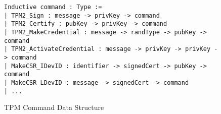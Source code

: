 \documentclass[runningheads]{llncs}
\begin{document}
\begin{figure}[hbtp]
\vspace{-\medskipamount}
\vspace{-\medskipamount}
  \begin{footnotesize}
\begin{lstlisting}[language=Coq]
Inductive command : Type :=
| TPM2_Sign : message -> privKey -> command
| TPM2_Certify : pubKey -> privKey -> command
| TPM2_MakeCredential : message -> randType -> pubKey -> command
| TPM2_ActivateCredential : message -> privKey -> privKey -> command
| MakeCSR_IDevID : identifier -> signedCert -> pubKey -> command
| MakeCSR_LDevID : message -> signedCert -> command
| ...
\end{lstlisting}
\end{footnotesize}
\vspace{-\medskipamount}
\caption{TPM Command Data Structure}
\label{fig:command-model}
\end{figure}



\end{document}
